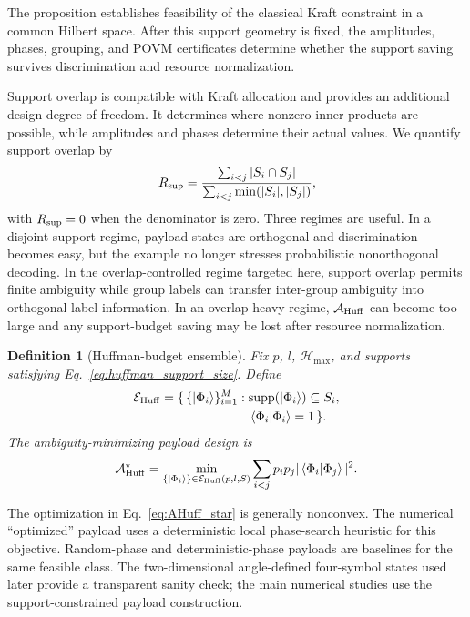 \documentclass[
 reprint,
 amsmath,amssymb,
 aps,
 pra,
 floatfix,
]{revtex4-2}
\newtheorem{definition}[theorem]{Definition}
\begin{document}
The proposition establishes feasibility of the classical Kraft constraint in a common Hilbert space. After this support geometry is fixed, the amplitudes, phases, grouping, and POVM certificates determine whether the support saving survives discrimination and resource normalization.

Support overlap is compatible with Kraft allocation and provides an additional design degree of freedom. It determines where nonzero inner products are possible, while amplitudes and phases determine their actual values. We quantify support overlap by
\begin{equation}
    R_{\rm sup}
    =
    \frac{\sum_{i<j}|S_i\cap S_j|}
    {\sum_{i<j}\min(|S_i|,|S_j|)},
    \label{eq:support_overlap_ratio}
\end{equation}
with \(R_{\rm sup}=0\) when the denominator is zero. Three regimes are useful. In a disjoint-support regime, payload states are orthogonal and discrimination becomes easy, but the example no longer stresses probabilistic nonorthogonal decoding. In the overlap-controlled regime targeted here, support overlap permits finite ambiguity while group labels can transfer inter-group ambiguity into orthogonal label information. In an overlap-heavy regime, \(\mathcal A_{\rm Huff}\) can become too large and any support-budget saving may be lost after resource normalization.

\begin{definition}[Huffman-budget ensemble]\label{def:huffman-ensemble}
Fix $p$, $l$, $\mathcal H_{\max}$, and supports satisfying Eq.~\eqref{eq:huffman_support_size}. Define
\begin{equation}
    \begin{split}
    \mathcal E_{\rm Huff}=
    \{\,\{\ket{\Phi_i}\}_{i=1}^M:\;&
    {\rm supp}(\ket{\Phi_i})\subseteq S_i,\\
    &\braket{\Phi_i|\Phi_i}=1\,\}.
    \end{split}
\end{equation}
The ambiguity-minimizing payload design is
\begin{equation}
    \mathcal A_{\rm Huff}^{\star}
    =
    \min_{\{\ket{\Phi_i}\}\in\mathcal E_{\rm Huff}(p,l,S)}
    \sum_{i<j}p_ip_j|\braket{\Phi_i|\Phi_j}|^2 .
    \label{eq:AHuff_star}
\end{equation}
\end{definition}

The optimization in Eq.~\eqref{eq:AHuff_star} is generally nonconvex. The numerical ``optimized'' payload uses a deterministic local phase-search heuristic for this objective. Random-phase and deterministic-phase payloads are baselines for the same feasible class. The two-dimensional angle-defined four-symbol states used later provide a transparent sanity check; the main numerical studies use the support-constrained payload construction.
\end{document}
